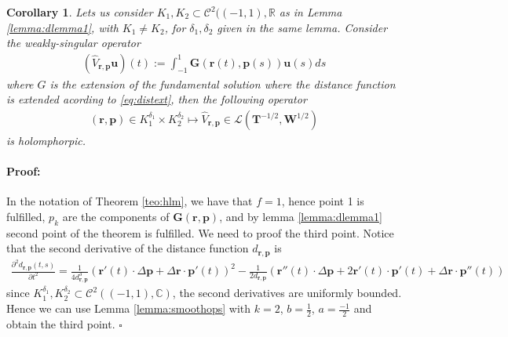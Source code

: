 \documentclass{article}
\newtheorem{corollary}[theorem]{Corollary}
\newenvironment{proof}{\paragraph{Proof:}}{\hfill$\square$}
\newcommand{\IC}{{\mathbb C}}
\newcommand{\IR}{{\mathbb R}}
\begin{document}
\begin{corollary}
Lets us consider $K_1, K_2 \subset \mathcal{C}^2((-1,1),\IR$ as in Lemma \ref{lemma:dlemma1}, with $K_1 \neq K_2$, for $\delta_1, \delta_2$ given in the same lemma. Consider the weakly-singular operator 
\begin{align*}
(\widehat{V}_{\mathbf{r},\mathbf{p}}\mathbf{u} )(t):=\int_{-1}^{1} \mathbf{G}(\mathbf{r}(t),\mathbf{p}(s)) \mathbf{u}(s) ds
\end{align*}
where $G$ is the extension of the fundamental solution where the distance function is extended acording to \ref{eq:distext}, then the following operator 
\begin{align*}
(\mathbf{r},\mathbf{p}) \in K_1^{\delta_1} \times K_2^{\delta_2} \mapsto \widehat{V}_{\mathbf{r},\mathbf{p}} \in \mathcal{L}(\mathbf{T}^{-1/2},\mathbf{W}^{1/2})
\end{align*} 
is holomphorpic. 
\end{corollary} 
\begin{proof}
In the notation of  Theorem \ref{teo:hlm}, we have that $f=1$, hence point 1 is fulfilled, $p_k$ are the components of  $\mathbf{G}(\mathbf{r},\mathbf{p})$, and by lemma \ref{lemma:dlemma1} second point of the theorem is fulfilled. We need to proof the third point. Notice that the second derivative of the distance function $d_{\mathbf{r},\mathbf{p}}$  is
\begin{align*}
\frac{\partial^2d_{\mathbf{r},\mathbf{p}}(t,s) }{\partial t ^2} = \frac{1}{4d_{\mathbf{r},\mathbf{p}}^3}(\mathbf{r}'(t) \cdot \Delta \mathbf{p} +\Delta \mathbf{r} \cdot \mathbf{p}'(t))^2-\frac{1}{2 d_{\mathbf{r},\mathbf{p}}} (\mathbf{r}''(t)\cdot \Delta \mathbf{p} + 2 \mathbf{r}'(t) \cdot \mathbf{p}'(t)+\Delta \mathbf{r} \cdot \mathbf{p}''(t))
\end{align*}
since $K_1^{\delta_1},K_2^{\delta_2} \subset \mathcal{C}^2((-1,1),\IC)$, the second derivatives are uniformly bounded. Hence we can use Lemma \ref{lemma:smoothops} with $k=2$, $b= \frac{1}{2}$, $a = \frac{-1}{2}$ and obtain the third point. 
\end{proof}
\end{document}
